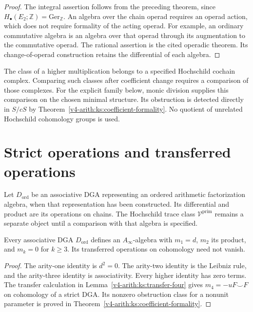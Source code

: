 \begin{proof}
The integral assertion follows from the preceding theorem, since
$H_\bullet(E_2;\mathbb Z)=\mathrm{Ger}_{\mathbb Z}$.
An algebra over the chain operad requires an operad action, which does
not require formality of the acting operad.
For example, an ordinary commutative algebra is an algebra over that
operad through its augmentation to the commutative operad.
The rational assertion is the cited operadic theorem.
Its change-of-operad construction retains the differential of each algebra.
\end{proof}

\begin{remark}
The class of a higher multiplication belongs to a specified Hochschild
cochain complex. Comparing such classes after coefficient change requires
a comparison of those complexes.
For the explicit family below, monic division supplies this comparison
on the chosen minimal structure.
Its obstruction is detected directly in $S/cS$ by
Theorem~\ref{v4-arith:ks:coefficient-formality}.
No quotient of unrelated Hochschild cohomology groups is used.
\end{remark}

\section{Strict operations and transferred operations}
\label{v4-arith:ks:higher-products-vanish}

Let $D_{\mathrm{ord}}$ be an associative DGA representing an ordered
arithmetic factorization algebra, when that representation has been constructed.
Its differential and product are its operations on chains.
The Hochschild trace class $\mathcal V^{\mathrm{prim}}$ remains a separate
object until a comparison with that algebra is specified.

\begin{theorem}
\label{v4-arith:thm:mk-vanish}
\ClaimStatusProvedHere{}
Every associative DGA $D_{\mathrm{ord}}$ defines an $A_\infty$-algebra
with $m_1=d$, $m_2$ its product, and $m_k=0$ for $k\geq3$.
Its transferred operations on cohomology need not vanish.
\end{theorem}

\begin{proof}
The arity-one identity is $d^2=0$.
The arity-two identity is the Leibniz rule, and the arity-three
identity is associativity. Every higher identity has zero terms.
The transfer calculation in Lemma~\ref{v4-arith:ks:transfer-four} gives
$m_4=-uF\smile F$ on cohomology of a strict DGA.
Its nonzero obstruction class for a nonunit parameter is proved in
Theorem~\ref{v4-arith:ks:coefficient-formality}.
\end{proof}

